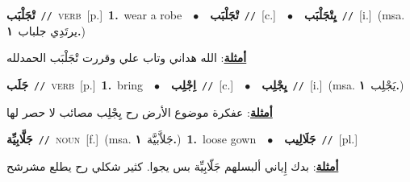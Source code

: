 \documentclass[10pt,a4paper,twoside]{article} %
\begin{document}
\begin{multicols}{2}
{\setlength\topsep{0pt}\textbf{\foreignlanguage{arabic}{تْجَلْبَب}}\ {\color{gray}\texttt{//}\color{black}}\ \textsc{verb}\ [p.]\ \textbf{1.}~wear a robe\ \ $\bullet$\ \ \setlength\topsep{0pt}\textbf{\foreignlanguage{arabic}{تْجَلْبَب}}\ {\color{gray}\texttt{//}\color{black}}\ [c.]\ \ $\bullet$\ \ \setlength\topsep{0pt}\textbf{\foreignlanguage{arabic}{يِتْجَلْبَب}}\ {\color{gray}\texttt{//}\color{black}}\ [i.]\ \color{gray}(msa. \foreignlanguage{arabic}{يرتَدِي جلباب}~\foreignlanguage{arabic}{\textbf{١.}})\color{black}\  \begin{flushright}\color{gray}\foreignlanguage{arabic}{\textbf{\underline{\foreignlanguage{arabic}{أمثلة}}}: الله هداني وتاب علي وقررت تْجَلْبَب الحمدلله}\end{flushright}\color{black}} \vspace{2mm}

{\setlength\topsep{0pt}\textbf{\foreignlanguage{arabic}{جَلَب}}\ {\color{gray}\texttt{//}\color{black}}\ \textsc{verb}\ [p.]\ \textbf{1.}~bring\ \ $\bullet$\ \ \setlength\topsep{0pt}\textbf{\foreignlanguage{arabic}{اِجْلِب}}\ {\color{gray}\texttt{//}\color{black}}\ [c.]\ \ $\bullet$\ \ \setlength\topsep{0pt}\textbf{\foreignlanguage{arabic}{يِجْلِب}}\ {\color{gray}\texttt{//}\color{black}}\ [i.]\ \color{gray}(msa. \foreignlanguage{arabic}{يَجْلِب}~\foreignlanguage{arabic}{\textbf{١.}})\color{black}\  \begin{flushright}\color{gray}\foreignlanguage{arabic}{\textbf{\underline{\foreignlanguage{arabic}{أمثلة}}}: عفكرة موضوع الأرض رح يِجْلِب مصائب لا حصر لها}\end{flushright}\color{black}} \vspace{2mm}

{\setlength\topsep{0pt}\textbf{\foreignlanguage{arabic}{جَلَّابِيِّة}}\ {\color{gray}\texttt{//}\color{black}}\ \textsc{noun}\ [f.]\ \color{gray}(msa. \foreignlanguage{arabic}{جَلاَّبيَّة}~\foreignlanguage{arabic}{\textbf{١.}})\color{black}\ \textbf{1.}~loose gown\ \ $\bullet$\ \ \setlength\topsep{0pt}\textbf{\foreignlanguage{arabic}{جَلَالِيب}}\ {\color{gray}\texttt{//}\color{black}}\ [pl.]\  \begin{flushright}\color{gray}\foreignlanguage{arabic}{\textbf{\underline{\foreignlanguage{arabic}{أمثلة}}}: بدك إِياني ألبسلهم جَلّابِيِّة بس يجوا. كثير شكلي رح يطلع مشرشح}\end{flushright}\color{black}} \vspace{2mm}


\end{multicols}
\end{document}
